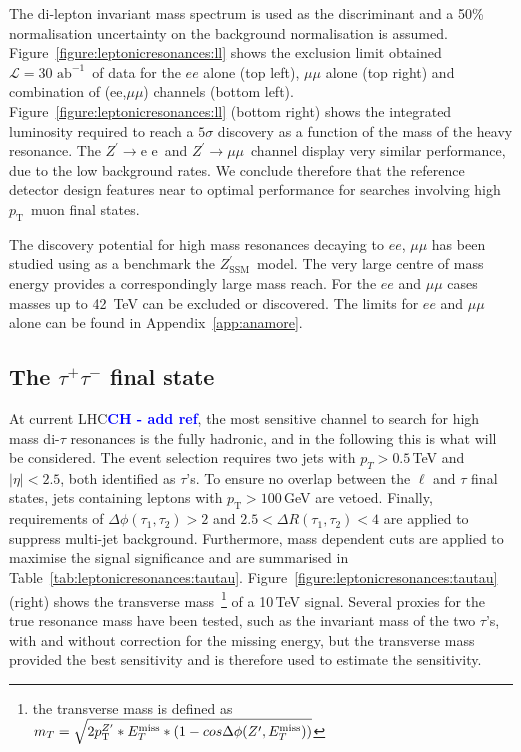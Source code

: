 \documentclass[a4paper,11pt]{article}
\newcommand{\CH}[1] {\textbf{\textcolor{blue}{CH - #1}}}
\newcommand{\Zp}{\ensuremath{Z^{\prime}}}
\newcommand{\ZpSSM}{\ensuremath{Z^{\prime}_{\mathrm{SSM}}}}
\newcommand*{\Zpee}{\ensuremath{Z^{\prime}\rightarrow \text{e e}}}
\newcommand*{\Zpmumu}{\ensuremath{Z^{\prime}\rightarrow \mu\mu}}
\newcommand{\pt}{\ensuremath{p_{\text{T}}}}
\newcommand{\ptZp}{\ensuremath{p_{\text{T}}^{\ensuremath{Z^{\prime}}}}}
\newcommand*{\met}{\ensuremath{E_{T}^{\rm{miss}}}}
\newcommand*{\intlumifcc}{\ensuremath{\mathcal{L}=30\text{ ab}^{-1}}}
\newcommand*{\tautau}{\ensuremath{\tau^{+}\tau^{-}}}
\begin{document}
The di-lepton invariant mass spectrum is used as the discriminant and a 50\% normalisation uncertainty on the background normalisation is assumed.
Figure~\ref{figure:leptonicresonances:ll} shows the exclusion limit obtained \intlumifcc\ of data for the $ee$ alone (top left), $\mu\mu$ alone (top right) and combination of (ee,$\mu\mu$) channels (bottom left). Figure~\ref{figure:leptonicresonances:ll} (bottom right) shows the integrated luminosity required to reach a $5\sigma$ discovery as a function of the mass of the heavy resonance. The \Zpee\ and \Zpmumu\ channel display very similar performance, due to the low background rates. We conclude therefore that the reference detector design features near to optimal performance for searches involving high \pt\ muon final states.

The discovery potential for high mass resonances decaying to $ee$, $\mu\mu$ has been studied using as a benchmark the \ZpSSM\ model. The very large centre of mass energy provides a correspondingly large mass reach. For the $ee$ and $\mu\mu$ cases masses up to 42~TeV can be excluded or discovered.
The limits for $ee$ and $\mu\mu$ alone can be found in Appendix~\ref{app:anamore}.

\subsection{The \texorpdfstring{\tautau}{tautau} final state}
\label{sec:leptautau}

At current LHC\CH{add ref}, the most sensitive channel to search for high mass di-$\tau$ resonances is the fully hadronic, and in the following this is what will be considered.
The event selection requires two jets with $p_{T} > 0.5$\,TeV and $|\eta|<2.5$, both identified as $\tau$'s. To ensure no overlap between the $\ell$ and $\tau$ final states, jets containing leptons with $\pt > 100$\,GeV are vetoed. Finally, requirements of $\Delta \phi(\tau_1, \tau_2)> 2$ and $2.5<\Delta R(\tau_1, \tau_2)<4$ are applied to suppress multi-jet background.
Furthermore, mass dependent cuts are applied to maximise the signal significance and are summarised in Table~\ref{tab:leptonicresonances:tautau}. Figure~\ref{figure:leptonicresonances:tautau} (right) shows the transverse mass~\footnote{the transverse mass is defined as $m_{T}  =  \sqrt{2\ptZp*\met*(1-cos\Delta\phi(\Zp,\met))} $}
of a 10\,TeV signal. Several proxies for the true resonance mass have been tested, such as the invariant mass of the two $\tau$'s, with and without correction for the missing energy, but the transverse mass provided the best sensitivity and is therefore used to estimate the sensitivity.
\end{document}
